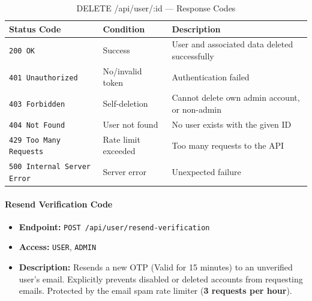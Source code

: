 \begin{table}[H]
\centering
\renewcommand{\arraystretch}{1.3}
\begin{tabularx}{\textwidth}{|l|l|X|}
\hline
\textbf{Status Code} & \textbf{Condition} & \textbf{Description} \\
\hline
\texttt{200 OK}           & Success              & User and associated data deleted successfully \\
\hline
\texttt{401 Unauthorized} & No/invalid token     & Authentication failed \\
\hline
\texttt{403 Forbidden}    & Self-deletion        & Cannot delete own admin account, or non-admin \\
\hline
\texttt{404 Not Found}    & User not found       & No user exists with the given ID \\
\hline
\texttt{429 Too Many Requests} & Rate limit exceeded & Too many requests to the API \\
\hline
\texttt{500 Internal Server Error} & Server error & Unexpected failure \\
\hline
\end{tabularx}
\caption{DELETE /api/user/:id — Response Codes}
\label{tab:delete-user-by-id-responses}
\end{table}
\FloatBarrier

\paragraph{Resend Verification Code}
\label{subsubsec:resend-verification-code}

\begin{itemize}
  \item \textbf{Endpoint:} \texttt{POST /api/user/resend-verification}
  \item \textbf{Access:} \texttt{USER}, \texttt{ADMIN}
  \item \textbf{Description:} Resends a new OTP (Valid for 15 minutes) to an unverified user's email. Explicitly prevents disabled or deleted accounts from requesting emails. Protected by the email spam rate limiter (\textbf{3 requests per hour}).
\end{itemize}

